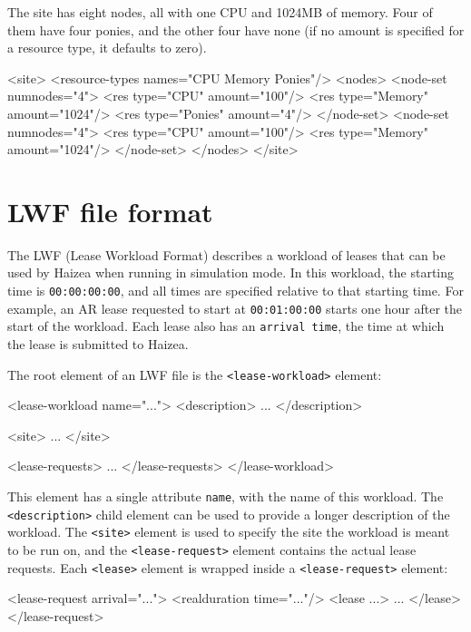 The site has eight nodes, all with one CPU and 1024MB of memory. Four of them have four ponies, and the other four have none (if no amount is specified for a resource type, it defaults to zero).

\begin{wideshellverbatim} 
<site>
  <resource-types names="CPU Memory Ponies"/>
  <nodes>
    <node-set numnodes="4">
      <res type="CPU" amount="100"/>
      <res type="Memory" amount="1024"/>
      <res type="Ponies" amount="4"/>
    </node-set>
    <node-set numnodes="4">
      <res type="CPU" amount="100"/>
      <res type="Memory" amount="1024"/>
    </node-set>
  </nodes>
</site>
\end{wideshellverbatim} 

\section{LWF file format}

The LWF (Lease Workload Format) describes a workload of leases that can be used by Haizea when running in simulation mode. In this workload, the starting time is \texttt{00:00:00:00}, and all times are specified relative to that starting time. For example, an AR lease requested to start at \texttt{00:01:00:00} starts one hour after the start of the workload. Each lease also has an \texttt{arrival time}, the time at which the lease is submitted to Haizea.

The root element of an LWF file is the \texttt{<lease-workload>} element:

\begin{wideshellverbatim} 
<lease-workload name="...">
  <description>
	...
  </description>
  
  <site>
    ...
  </site>
  
  <lease-requests>
    ...
  </lease-requests>
</lease-workload>
\end{wideshellverbatim} 

This element has a single attribute \texttt{name}, with the name of this workload. The \texttt{<description>} child element can be used to provide a longer description of the workload. The \texttt{<site>} element is used to specify the site the workload is meant to be run on, and the \texttt{<lease-request>} element contains the actual lease requests. Each \texttt{<lease>} element is wrapped inside a \texttt{<lease-request>} element:

\begin{wideshellverbatim} 
<lease-request arrival="...">
  <realduration time="..."/>
  <lease ...>
      ...
  </lease>
</lease-request>
\end{wideshellverbatim} 

